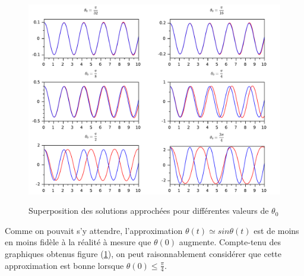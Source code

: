 \documentclass[a4paper,10pt]{report}
\begin{document}
\begin{figure}[H]
\centering
\caption{Superposition des solutions approchées pour différentes valeurs de $\theta_0$}
\includegraphics[width=\textwidth]{graph_pendule.pdf}
\label{aff_pendule}
\end{figure}
Comme on pouvait s'y attendre, l'approximation $\theta(t)\simeq sin\theta(t)$ est de moins en moins fidèle à la réalité à mesure que $\theta(0)$ augmente. Compte-tenu des graphiques obtenus figure (\ref{aff_pendule}), on peut raisonnablement considérer que cette approximation est bonne lorsque $\theta(0) \leq \frac{\pi}{4}$. \\
\end{document}
